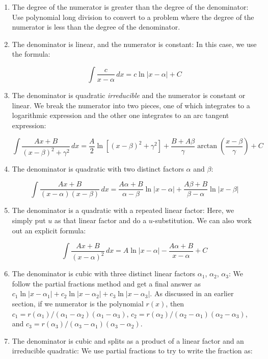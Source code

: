 \documentclass[10pt]{amsart}
\begin{document}
\begin{enumerate}
\item The degree of the numerator is greater than the degree of the
  denominator: Use polynomial long division to convert to a problem
  where the degree of the numerator is less than the degree of the
  denominator.
\item The denominator is linear, and the numerator is constant: In this
  case, we use the formula:

  $$\int \frac{c}{x - \alpha} \, dx = c\ln|x - \alpha| + C$$
\item The denominator is quadratic {\em irreducible} and the numerator
  is constant or linear. We break the numerator into two pieces, one
  of which integrates to a logarithmic expression and the other one
  integrates to an arc tangent expression:

  $$\int \frac{Ax + B}{(x - \beta)^2 + \gamma^2} \, dx = \frac{A}{2} \ln\left[(x - \beta)^2 + \gamma^2\right] + \frac{B + A\beta}{\gamma} \arctan\left(\frac{x - \beta}{\gamma}\right) + C$$

\item The denominator is quadratic with two distinct factors $\alpha$
  and $\beta$:

  $$\int \frac{Ax + B}{(x - \alpha)(x - \beta)} \, dx= \frac{A\alpha + B}{\alpha - \beta} \ln|x - \alpha| + \frac{A\beta + B}{\beta - \alpha} \ln|x - \beta|$$

\item The denominator is a quadratic with a repeated linear factor:
  Here, we simply put $u$ as that linear factor and do a
  $u$-substitution. We can also work out an explicit formula:

  $$\int \frac{Ax + B}{(x - \alpha)^2} \, dx = A\ln|x - \alpha| - \frac{A\alpha + B}{x - \alpha} + C$$

\item The denominator is cubic with three distinct linear factors
  $\alpha_1$, $\alpha_2$, $\alpha_3$: We follow the partial fractions
  method and get a final answer as $c_1\ln|x - \alpha_1| + c_2\ln|x -
  \alpha_2| + c_3 \ln|x - \alpha_3|$. As discussed in an earlier
  section, if we numerator is the polynomial $r(x)$, then $c_1 =
  r(\alpha_1)/(\alpha_1 - \alpha_2)(\alpha_1 - \alpha_3)$, $c_2 =
  r(\alpha_2)/(\alpha_2 - \alpha_1)(\alpha_2 - \alpha_3)$, and $c_3 =
  r(\alpha_3)/(\alpha_3 - \alpha_1)(\alpha_3 - \alpha_2)$.

\item The denominator is cubic and splits as a product of a linear
  factor and an irreducible quadratic: We use partial fractions to try
  to write the fraction as:


\end{enumerate}
\end{document}
